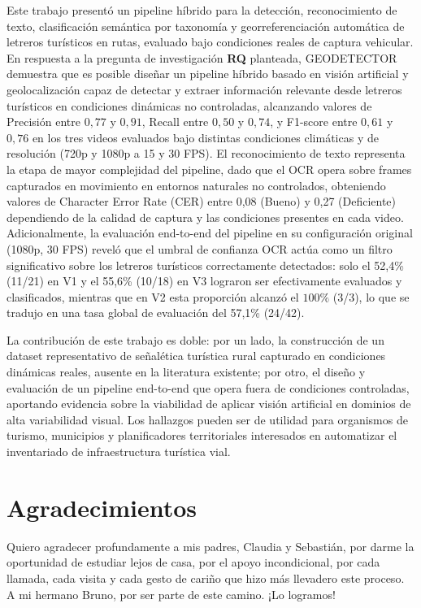 \documentclass[runningheads]{llncs}
\begin{document}
Este trabajo presentó un pipeline híbrido para la detección, 
reconocimiento de texto, clasificación semántica por taxonomía y 
georreferenciación automática de letreros turísticos en rutas, evaluado 
bajo condiciones reales de captura vehicular. En respuesta a la pregunta 
de investigación \textbf{RQ} planteada, GEODETECTOR demuestra que es 
posible diseñar un pipeline híbrido basado en visión artificial y 
geolocalización capaz de detectar y extraer información relevante desde 
letreros turísticos en condiciones dinámicas no controladas, alcanzando 
valores de Precisión entre $0{,}77$ y $0{,}91$, Recall entre $0{,}50$ 
y $0{,}74$, y F1-score entre $0{,}61$ y $0{,}76$ en los tres videos 
evaluados bajo distintas condiciones climáticas y de resolución (720p 
y 1080p a 15 y 30 FPS). El reconocimiento de texto representa la etapa 
de mayor complejidad del pipeline, dado que el OCR opera sobre frames 
capturados en movimiento en entornos naturales no controlados, 
obteniendo valores de Character Error Rate (CER) entre 0,08 (Bueno) y 
0,27 (Deficiente) dependiendo de la calidad de captura y las condiciones 
presentes en cada video. Adicionalmente, la evaluación end-to-end del 
pipeline en su configuración original (1080p, 30 FPS) reveló que el 
umbral de confianza OCR actúa como un filtro significativo sobre los 
letreros turísticos correctamente detectados: solo el 52,4\%
(11/21) en V1 y el 55,6\% (10/18) en V3 lograron ser 
efectivamente evaluados y clasificados, mientras que en V2 esta 
proporción alcanzó el $100\%$ (3/3), lo que se tradujo en una tasa
 global de evaluación del 57,1\% (24/42).

La contribución de este trabajo es doble: por un lado, 
la construcción de un dataset representativo de señalética 
turística rural capturado en condiciones dinámicas reales, 
ausente en la literatura existente; por otro, el diseño y 
evaluación de un pipeline end-to-end que opera fuera de condiciones 
controladas, aportando evidencia sobre la viabilidad de aplicar visión 
artificial en dominios de alta variabilidad visual. 
Los hallazgos pueden ser de utilidad para organismos de turismo, 
municipios y planificadores territoriales interesados en automatizar 
el inventariado de infraestructura turística vial.


\section{Agradecimientos}
Quiero agradecer profundamente a mis padres, Claudia y Sebastián, por 
darme la oportunidad de estudiar lejos de casa, por el apoyo incondicional, 
por cada llamada, cada visita y cada gesto de cariño que hizo más 
llevadero este proceso. A mi hermano Bruno, por ser parte de este camino.
¡Lo logramos!
\end{document}
